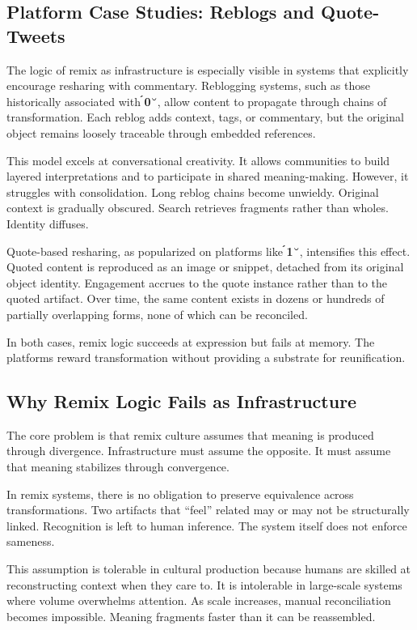 \documentclass[11pt,oneside]{article}
\begin{document}
\subsection{Platform Case Studies: Reblogs and Quote-Tweets}

The logic of remix as infrastructure is especially visible in systems that explicitly encourage resharing with commentary. Reblogging systems, such as those historically associated with \textbf{0}, allow content to propagate through chains of transformation. Each reblog adds context, tags, or commentary, but the original object remains loosely traceable through embedded references.

This model excels at conversational creativity. It allows communities to build layered interpretations and to participate in shared meaning-making. However, it struggles with consolidation. Long reblog chains become unwieldy. Original context is gradually obscured. Search retrieves fragments rather than wholes. Identity diffuses.

Quote-based resharing, as popularized on platforms like \textbf{1}, intensifies this effect. Quoted content is reproduced as an image or snippet, detached from its original object identity. Engagement accrues to the quote instance rather than to the quoted artifact. Over time, the same content exists in dozens or hundreds of partially overlapping forms, none of which can be reconciled.

In both cases, remix logic succeeds at expression but fails at memory. The platforms reward transformation without providing a substrate for reunification.

\subsection{Why Remix Logic Fails as Infrastructure}

The core problem is that remix culture assumes that meaning is produced through divergence. Infrastructure must assume the opposite. It must assume that meaning stabilizes through convergence.

In remix systems, there is no obligation to preserve equivalence across transformations. Two artifacts that “feel” related may or may not be structurally linked. Recognition is left to human inference. The system itself does not enforce sameness.

This assumption is tolerable in cultural production because humans are skilled at reconstructing context when they care to. It is intolerable in large-scale systems where volume overwhelms attention. As scale increases, manual reconciliation becomes impossible. Meaning fragments faster than it can be reassembled.
\end{document}
